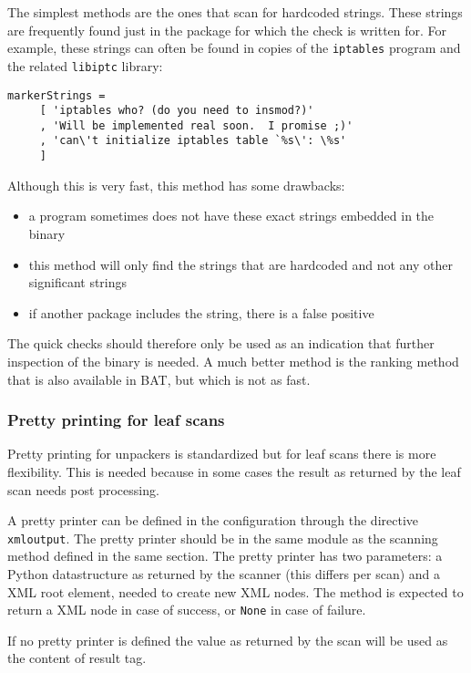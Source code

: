\documentclass[10pt]{article}
\begin{document}
The simplest methods are the ones that scan for hardcoded strings. These strings
are frequently found just in the package for which the check is written for. For
example, these strings can often be found in copies of the \texttt{iptables}
program and the related \texttt{libiptc} library:

\begin{verbatim}
markerStrings =
     [ 'iptables who? (do you need to insmod?)'
     , 'Will be implemented real soon.  I promise ;)'
     , 'can\'t initialize iptables table `%s\': \%s'
     ]
\end{verbatim}

Although this is very fast, this method has some drawbacks:

\begin{itemize}
\item a program sometimes does not have these exact strings embedded in the
binary
\item this method will only find the strings that are hardcoded and not any
other significant strings
\item if another package includes the string, there is a false positive
\end{itemize}

The quick checks should therefore only be used as an indication that further
inspection of the binary is needed. A much better method is the ranking method
that is also available in BAT, but which is not as fast.

\subsubsection{Pretty printing for leaf scans}

Pretty printing for unpackers is standardized but for leaf scans there is
more flexibility. This is needed because in some cases the result as returned
by the leaf scan needs post processing.

A pretty printer can be defined in the configuration through the directive
\texttt{xmloutput}. The pretty printer should be in the same module as the
scanning method defined in the same section. The pretty printer has two
parameters: a Python datastructure as returned by the scanner (this differs
per scan) and a XML root element, needed to create new XML nodes. The method is
expected to return a XML node in case of success, or \texttt{None} in case of
failure.

If no pretty printer is defined the value as returned by the scan will be used
as the content of result tag.
\end{document}
